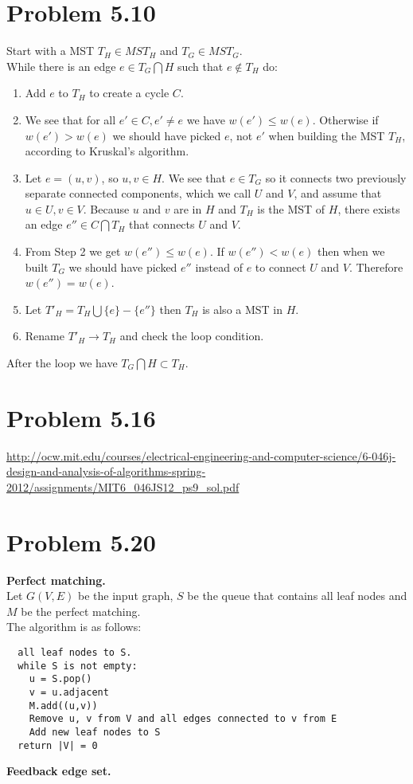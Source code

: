 \documentclass[12pt]{report}
\begin{document}
\section{Problem 5.10}
Start with a MST $T_H \in MST_H$ and $T_G \in MST_G$. \\
While there is an edge $e \in T_G \bigcap H$ such that $e \notin T_H$ do:
\begin{enumerate}
  \item Add $e$ to $T_H$ to create a cycle $C$.
  \item We see that for all $e' \in C, e' \ne e$ we have $w(e') \le w(e)$. Otherwise if $w(e') > w(e)$ we should have picked $e$, not $e'$ when building the MST $T_H$, according to Kruskal's algorithm.
  \item Let $e = (u,v)$, so $u, v \in H$. We see that $e \in T_G$ so it connects two previously separate connected components, which we call $U$ and $V$, and assume that $u \in U, v \in V$. Because $u$ and $v$ are in $H$ and $T_H$ is the MST of $H$, there exists an edge $e'' \in C \bigcap T_H$ that connects $U$ and $V$. 
  \item From Step 2 we get $w(e'') \le w(e)$. If $w(e'') < w(e)$ then when we built $T_G$ we should have picked $e''$ instead of $e$ to connect $U$ and $V$. Therefore $w(e'') = w(e)$. 
  \item Let $T'_H = T_H \bigcup \{ e \} - \{ e''\}$ then $T_H$ is also a MST in $H$.
  \item Rename $T'_H \to T_H$ and check the loop condition.
\end{enumerate}

After the loop we have $T_G \bigcap H \subset T_H$.

\section{Problem 5.16}
\url{http://ocw.mit.edu/courses/electrical-engineering-and-computer-science/6-046j-design-and-analysis-of-algorithms-spring-2012/assignments/MIT6_046JS12_ps9_sol.pdf}

\section{Problem 5.20}
{\bf Perfect matching.} \\
Let $G(V,E)$ be the input graph, $S$ be the queue that contains all leaf nodes and $M$ be the perfect matching. \\
The algorithm is as follows:
\begin{lstlisting}
  all leaf nodes to S.
  while S is not empty:
    u = S.pop()
    v = u.adjacent
    M.add((u,v))
    Remove u, v from V and all edges connected to v from E
    Add new leaf nodes to S
  return |V| = 0
\end{lstlisting}
{\bf Feedback edge set.} \\
\end{document}
